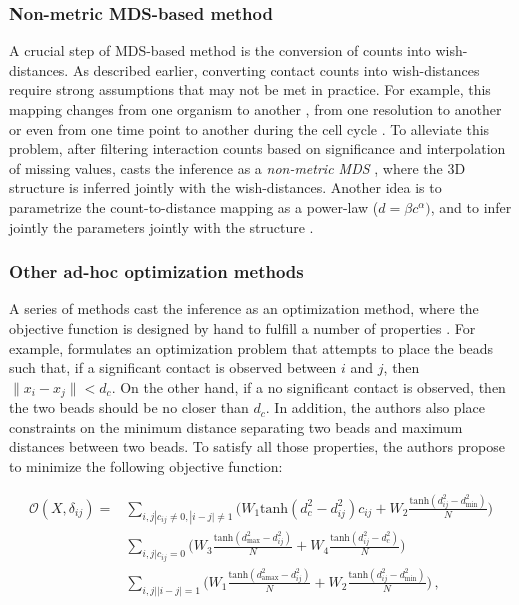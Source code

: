 \documentclass[letterpaper,12pt]{article}
\begin{document}
\subsubsection*{Non-metric MDS-based method}

A crucial step of MDS-based method is the conversion of counts into
wish-distances. As described earlier, converting contact counts into
wish-distances require strong assumptions that may not be met in practice. For
example, this mapping changes from one organism to another
\citep{fudenberg:higher-order}, from one resolution to another
\citep{zhang:inference} or even from one time point to another during the cell
cycle \citep{le:high-resolution, ay:three-dimensional}. To alleviate this
problem, after filtering interaction counts based on significance and
interpolation of missing values, \citet{ben-elazar:spatial} casts the
inference as a \emph{non-metric MDS} \citep{kruskal:multidimensional}, where
the 3D structure is inferred jointly with the wish-distances. Another idea is
to parametrize the count-to-distance mapping as a power-law ($d = \beta
c^\alpha)$, and to infer jointly the parameters jointly with the structure
\citet{zhang:inference}.

\subsubsection*{Other ad-hoc optimization methods}

A series of methods cast the inference as an optimization method, where the
objective function is designed by hand to fulfill a number of properties
\citep{trieu:large, trieu:MOGEN, trieu:3D}. For example, \citep{trieu:large}
formulates an optimization problem that attempts to place the beads such that,
if a significant contact is observed between $i$ and $j$, then $\| x_i - x_j
\| < d_c$. On the other hand, if a no significant contact is observed, then
the two beads should be no closer than $d_c$. In addition, the authors also
place constraints on the minimum distance separating two beads and maximum
distances between two beads. To satisfy all those properties, the authors
propose to minimize the following objective function:

\begin{equation*}
\begin{aligned}
\mathcal{O}(X, \delta_{ij}) = & \underset{i, j | c_{ij} \neq 0, |i-j| \neq 1}{\sum} \Bigg(W_1 \text{tanh}(d^2_c -
d^2_{ij}) c_{ij} + W_2 \frac{\text{tanh}(d^2_{ij} - d^2_\text{min})}{N} \Bigg) \\
& \underset{i, j | c_{ij} = 0}{\sum} \Bigg(W_3 \frac{\text{tanh}(d^2_\text{max} -
d^2_{ij})}{N} + W_4 \frac{\text{tanh}(d^2_{ij} -
d^2_{c})}{N}\Bigg) \\
& \underset{i, j | |i - j| = 1}{\sum} \Bigg(W_1 \frac{\text{tanh}(d^2_\text{amax} -
d^2_{ij})}{N} + W_2 \frac{\text{tanh}(d^2_{ij} -
d^2_\text{min})}{N}\Bigg) \,,\\
\end{aligned}
\end{equation*}
\end{document}
